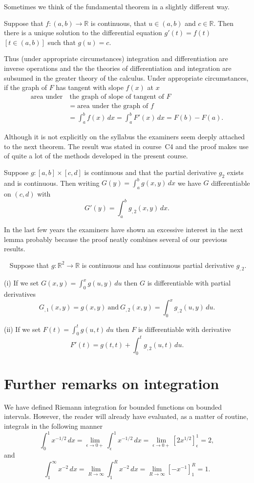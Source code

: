 Sometimes we think of the fundamental theorem
in a slightly different way.
\begin{theorem} Suppose that $f:(a,b)\rightarrow{\mathbb R}$ is
continuous, that $u\in(a,b)$ and $c\in{\mathbb R}$.
Then there is a unique solution
to the differential equation $g'(t)=f(t)$ $[t\in(a,b)]$
such that $g(u)=c$.
\end{theorem}
Thus (under appropriate circumstances) integration
and differentiation are inverse operations and the
the theories of differentiation and integration
are subsumed in the greater theory of the calculus.
Under appropriate circumstances, if the graph of $F$
has tangent with slope $f(x)$ at $x$
\begin{align*}
\text{area under}&\ \text{the graph of slope of tangent of $F$}\\
&=\text{area under the graph of $f$}\\
&=\int_{a}^{b}f(x)\,dx=\int_{a}^{b}F'(x)\,dx=F(b)-F(a).
\end{align*}

Although it is not explicitly on the syllabus
the examiners seem deeply attached to the
next theorem. The result was stated in
course~C4 and the proof makes use of quite 
a lot of the methods developed in the present course.
\begin{theorem}%
\label{under integral} 
Suppose $g:[a,b]\times[c,d]$ is
continuous and that the partial derivative $g_{2}$
exists and is continuous. Then writing 
$G(y)=\int_{a}^{b}g(x,y)\,dx$
we have $G$ differentiable on $(c,d)$ with
\[G'(y)=\int_{a}^{b}g_{,2}(x,y)\,dx.\]
\end{theorem}

In the last few years the examiners
have shown an excessive interest in the next lemma
probably because the proof
neatly combines several of our previous results.
\begin{lemma}~\label{double}
Suppose that $g:{\mathbb R}^{2}\rightarrow{\mathbb R}$
is continuous and has continuous partial derivative
$g_{,2}$.

(i) If we set $G(x,y)=\int_{0}^{x}g(u,y)\,du$ then
$G$ is differentiable with partial derivatives
\[G_{,1}(x,y)=g(x,y)\ \text{and}
\ G_{,2}(x,y)=\int_{0}^{x}g_{,2}(u,y)\,du.\]

(ii) If we set $F(t)=\int_{0}^{t}g(u,t)\,du$ then
$F$ is differentiable with derivative
\[F'(t)=g(t,t)+\int_{0}^{t}g_{,2}(u,t)\,du.\]
\end{lemma}

\section{Further remarks on integration} We have
defined Riemann integration for bounded functions
on bounded intervals. However, the reader will already
have evaluated, as a matter of routine, integrals 
in the following manner
\[\int_{0}^{1}x^{-1/2}\,dx=\lim_{\epsilon\rightarrow 0+}
\int_{\epsilon}^{1}x^{-1/2}\,dx=
\lim_{\epsilon\rightarrow 0+}[2x^{1/2}]_{\epsilon}^{1}=2,\]
and
\[\int_{1}^{\infty}x^{-2}\,dx=\lim_{R\rightarrow \infty}
\int_{1}^{R}x^{-2}\,dx=
\lim_{R\rightarrow \infty}[-x^{-1}]_{1}^{R}=1.\]

